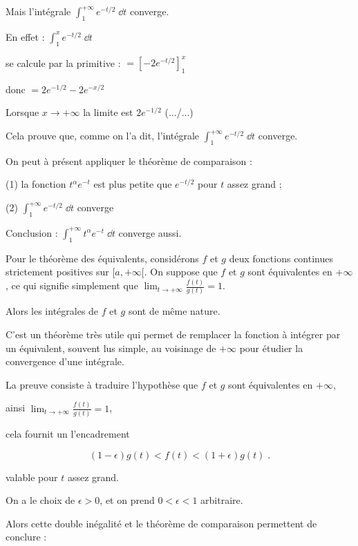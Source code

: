 Mais l'intégrale $\int_1^{+\infty} e^{-t/2}\;\dd t$ converge.

En effet :
$\int_1^x e^{-t/2}\;\dd t$

\change
se calcule par la primitive :
$= \left[-2 e^{-t/2}\right]_1^x$

\change
donc $= 2e^{-1/2} -2e^{-x/2}$

\change
Lorsque $x\rightarrow+\infty$
la limite est $2e^{-1/2}$ 
\hfill (.../...)

\change
Cela prouve que, comme on l'a dit, l'intégrale 
$\int_1^{+\infty} e^{-t/2}\;\dd t$ converge.

\change  
On peut à présent appliquer le théorème  de comparaison :

(1) la fonction $t^\alpha e^{-t}$ est plus petite que
$e^{-t/2}$ pour $t$ assez grand ;

(2) $\int_1^{+\infty} e^{-t/2}\;\dd t$ converge

Conclusion : 
$\int_1^{+\infty} t^\alpha e^{-t}\;\dd t$ converge aussi.

\diapo



Pour le théorème des équivalents, considérons $f$ et $g$ 
deux fonctions continues strictement positives sur $[a,+\infty[$.
On suppose que $f$ et $g$  sont équivalentes en $+\infty$, 
ce qui signifie simplement que $\lim_{t\rightarrow+\infty}\frac{f(t)}{g(t)} = 1$.

\change
Alors les intégrales de $f$ et $g$ sont de même nature.

C'est un théorème très utile qui permet de remplacer la fonction 
à intégrer par un équivalent, souvent lus simple, au voisinage de $+\infty$ 
pour étudier la convergence d'une intégrale.

\change

La preuve consiste à traduire l'hypothèse que $f$ et $g$ 
sont équivalentes en $+\infty$, 

ainsi $\lim_{t\rightarrow+\infty}\frac{f(t)}{g(t)} = 1$, 

\change
cela fournit un l'encadrement 

$$(1-\epsilon)g(t)<f(t)<(1+\epsilon)g(t)\;.$$

valable pour $t$ assez grand.

\change
On a le choix de $\epsilon>0$, et on prend $0<\epsilon<1$ arbitraire. 

Alors cette double inégalité et le théorème de comparaison permettent de conclure : 

